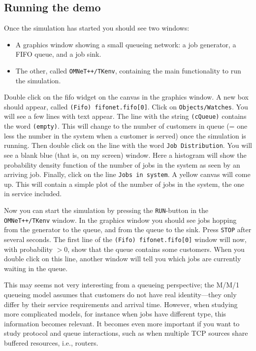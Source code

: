 \documentclass[a4paper]{article}
\begin{document}
\subsection{Running the demo}
\label{sec:running-simulation}
Once the simulation has started you should see two windows:
\begin{itemize}
\item A graphics window showing a small queueing network: a job
  generator, a FIFO queue, and a job sink.
\item The other, called \texttt{OMNeT++/TKenv}, containing the main  functionality to
  run the simulation.
\end{itemize}

Double click on the fifo widget on the canvas in the graphics window.
A new box should appear, called \texttt{(Fifo) fifonet.fifo[0]}. Click
on \texttt{Objects/Watches}.  You will see a few lines with text
appear. The line with the string \texttt{(cQueue)} contains the word
\texttt{(empty)}.  This will change to the number of customers in
queue (= one less the number in the system when a customer is served)
once the simulation is running.  Then double click on the line with
the word \texttt{Job Distribution}.  You will see a blank blue (that
is, on my screen) window. Here a histogram will show the probability
density function of the number of jobs in the system as seen by an
arriving job. Finally, click on the line \texttt{Jobs in system}. A
yellow canvas will come up. This will contain a simple plot of the
number of jobs in the system, the one in service included.

Now you can start the simulation by pressing the \texttt{RUN}-button
in the \texttt{OMNeT++/TKenv} window. In the graphics window you should
see jobs hopping from the generator to the queue, and from the queue
to the sink.  Press \texttt{STOP} after several seconds. The first
line of the \texttt{(Fifo) fifonet.fifo[0]} window will now, with probability
$ > 0$, show that the queue contains some customers. When you double
click on this line, another window will tell you which jobs are currently
waiting in the queue. 

This may seems not very interesting from a
queueing perspective; the M/M/1 queueing model assumes that
customers do not have real identity---they only differ by their
service requirements and arrival time. However, when studying more
complicated models, for instance when jobs have different type, this
information becomes relevant. It becomes even more important if you
want to study protocol and queue interactions, such as when multiple
TCP sources share buffered resources, i.e., routers. 
\end{document}

